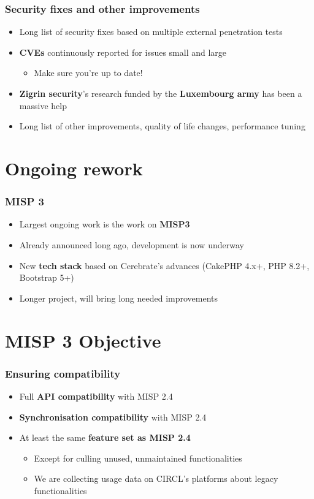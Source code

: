 \begin{frame}
  \frametitle{Security fixes and other improvements}
  \begin{itemize}
     \item Long list of security fixes based on multiple external penetration tests
     \item {\bf CVEs} continuously reported for issues small and large
     \begin{itemize}
         \item Make sure you're up to date!
     \end{itemize}
     \item {\bf Zigrin security}'s research funded by the {\bf Luxembourg army} has been a massive help
     \item Long list of other improvements, quality of life changes, performance tuning
  \end{itemize}
\end{frame}

\section{Ongoing rework}

\begin{frame}
  \frametitle{MISP 3}
  \begin{itemize}
     \item Largest ongoing work is the work on {\bf MISP3}
     \item Already announced long ago, development is now underway
     \item New {\bf tech stack} based on Cerebrate's advances (CakePHP 4.x+, PHP 8.2+, Bootstrap 5+)
     \item Longer project, will bring long needed improvements
  \end{itemize}
\end{frame}

\section{MISP 3 Objective}

\begin{frame}
  \frametitle{Ensuring compatibility}
  \begin{itemize}
     \item Full {\bf API compatibility} with MISP 2.4
     \item {\bf Synchronisation compatibility} with MISP 2.4
     \item At least the same {\bf feature set as MISP 2.4}
     \begin{itemize}
         \item Except for culling unused, unmaintained functionalities
         \item We are collecting usage data on CIRCL's platforms about legacy functionalities
     \end{itemize}
  \end{itemize}
\end{frame}

